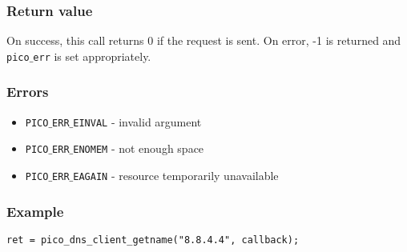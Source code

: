 \subsubsection*{Return value}
On success, this call returns 0 if the request is sent.
On error, -1 is returned and \texttt{pico$\_$err} is set appropriately.

\subsubsection*{Errors}
\begin{itemize}[noitemsep]
\item \texttt{PICO$\_$ERR$\_$EINVAL} - invalid argument
\item \texttt{PICO$\_$ERR$\_$ENOMEM} - not enough space
\item \texttt{PICO$\_$ERR$\_$EAGAIN} - resource temporarily unavailable
\end{itemize}

\subsubsection*{Example}
\begin{verbatim}
ret = pico_dns_client_getname("8.8.4.4", callback);
\end{verbatim}
